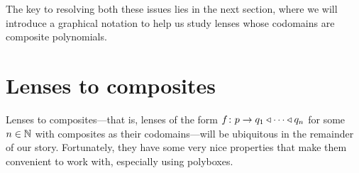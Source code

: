 \documentclass[Book-Poly]{subfiles}
\begin{document}
The key to resolving both these issues lies in the next section, where we will introduce a graphical notation to help us study lenses whose codomains are composite polynomials.



\section{Lenses to composites}\label{sec.comon.comp.to_comp}

Lenses to composites---that is, lenses of the form $f\colon p\to q_1\mathbin{\triangleleft}\cdots\mathbin{\triangleleft} q_n$ for some $n\in\mathbb{N}$ with composites as their codomains---will be ubiquitous in the remainder of our story.
Fortunately, they have some very nice properties that make them convenient to work with, especially using polyboxes.
\end{document}
